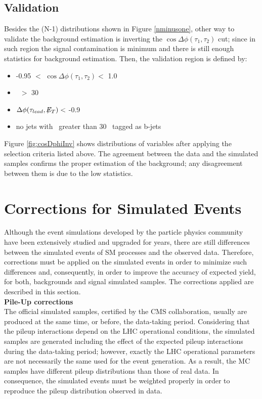 \subsection{Validation}
\label{subsec:Validation}

\noindent Besides the (N-1) distributions shown in Figure \ref{nminusone},
other way to validate the background estimation is inverting the 
$\cos \Delta \phi (\tau_{1},\tau_{2})$ cut; since in such region 
the signal contamination is minimum and there is still enough statistics 
for background estimation. Then, the validation 
region is defined by:

\begin{itemize}
 \item -0.95 $<$ $\cos\Delta \phi (\tau_{1},\tau_{2}) <$ 1.0
 \item \MET~$>$ 30 \GeV
 \item $\Delta \phi (\tau_{lead}, \not\!\!E_T) <$ -0.9
 \item no jets with \pt~greater than 30 \GeV~tagged as b-jets
\end{itemize}

\noindent Figure \ref{fig:cosDphiInv} shows distributions of variables after applying
the selection criteria listed above. The agreement between the data and the simulated
samples confirms the proper estimation of the background; any disagreement
between them is due to the low statistics.

\section{Corrections for Simulated Events}
\label{sec:PUCorrection}

\noindent Although the event simulations developed by the particle physics
community have been extensively studied and upgraded for years, there are still
differences between the simulated events of SM processes and the observed 
data. Therefore, corrections must be applied on the simulated events
in order to minimize such differences and, consequently, in order
to improve the accuracy of expected yield, for both, backgrounds and 
signal simulated samples. The corrections applied are 
described in this section.\\

\textbf{Pile-Up corrections} \\

\noindent The official simulated samples, certified by the CMS collaboration, usually 
are produced at the same time, or before, the data-taking period. Considering 
that the pileup interactions depend on the LHC operational conditions, the simulated 
samples are generated including the effect of the expected 
pileup interactions during the data-taking period; however, exactly 
the LHC operational parameters are not necessarily the same 
used for the event generation. As a result, the MC samples 
have different pileup distributions than those of real 
data. In consequence, the simulated events must be 
weighted properly in order to reproduce the pileup distribution
observed in data. \\

